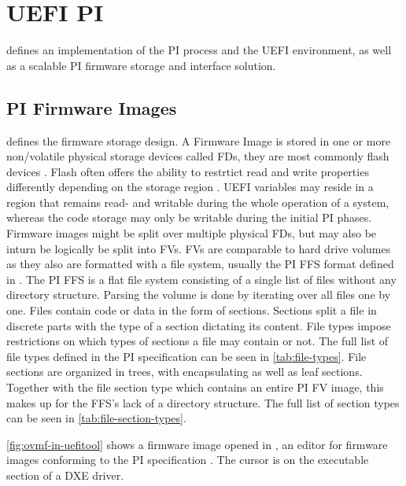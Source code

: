 
\section{\acs{UEFI} \acf{PI}}

\cite{pi-spec} defines an implementation of the \ac{PI} process and the \ac{UEFI} environment, as well as a scalable \ac{PI} firmware storage and interface solution.

\subsection{\acs{PI} Firmware Images}
\label{sec:ueif-pi:pi:pi-firmware-images}

\cite[Vol. 3, 2]{pi-spec} defines the firmware storage design.
A Firmware Image is stored in one or more non\-/volatile physical storage devices called \acp{FD}, they are most commonly flash devices \cite[Vol. 3, 2.1]{pi-spec}.
Flash often offers the ability to restrtict read and write properties differently depending on the storage region \cite[Vol. 3, 2.1.1]{pi-spec}.
\ac{UEFI} variables may reside in a region that remains read- and writable during the whole operation of a system, whereas the code storage may only be writable during the initial \ac{PI} phases.
Firmware images might be split over multiple physical \acp{FD}, but may also be inturn be logically be split into \acp{FV}.
\acp{FV} are comparable to hard drive volumes as they also are formatted with a file system, usually the \ac{PI} \ac{FFS} format defined in \cite[Vol. 3, 2.2]{pi-spec}.
The \ac{PI} \ac{FFS} is a flat file system consisting of a single list of files without any directory structure.
Parsing the volume is done by iterating over all files one by one.
Files contain code or data in the form of sections.
Sections split a file in discrete parts with the type of a section dictating its content.
File types impose restrictions on which types of sections a file may contain or not.
The full list of file types defined in the \ac{PI} specification can be seen in \autoref{tab:file-types}.
File sections are organized in trees, with encapsulating as well as leaf sections.
Together with the file section type  which contains an entire \ac{PI} \ac{FV} image, this makes up for the \ac{FFS}'s lack of a directory structure.
The full list of section types can be seen in \autoref{tab:file-section-types}.

\autoref{fig:ovmf-in-uefitool} shows a firmware image opened in , an editor for firmware images conforming to the \ac{PI} specification \cite{uefitool}.
The cursor is on the executable section of a \acs{DXE} driver.

